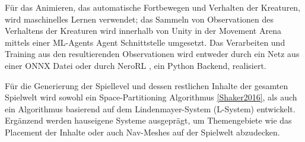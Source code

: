 Für das Animieren, das automatische Fortbewegen und Verhalten der Kreaturen, wird maschinelles Lernen verwendet; das Sammeln von Observationen des Verhaltens der Kreaturen wird innerhalb von Unity in der Movement Arena mittels einer ML-Agents Agent \cite{mlAgents} Schnittstelle umgesetzt. Das Verarbeiten und Training aus den resultierenden Observationen wird entweder durch ein Netz aus einer ONNX Datei oder durch NeroRL \cite{neroRL}, ein Python Backend, realisiert.

Für die Generierung der Spiellevel und dessen restlichen Inhalte der gesamten Spielwelt wird sowohl ein Space-Partitioning Algorithmus \ref{Shaker2016}, als auch ein Algorithmus basierend auf dem Lindenmayer-System (L-System) \cite{lindenmayer1990} entwickelt. Ergänzend werden hauseigene Systeme ausgeprägt, um Themengebiete wie das Placement der Inhalte oder auch Nav-Meshes auf der Spielwelt abzudecken.

